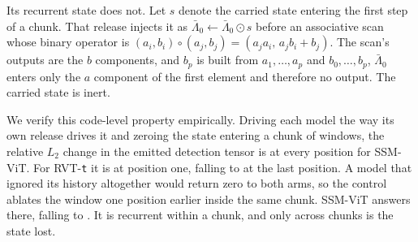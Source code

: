\documentclass[10pt,twocolumn,letterpaper]{article}
\begin{document}
Its recurrent state does not. Let $s$ denote the carried state entering the first
step of a chunk. That release injects it as
$\bar{\Lambda}_{0}\leftarrow\bar{\Lambda}_{0}\odot s$ before an associative scan whose
binary operator is $(a_{i},b_{i})\circ(a_{j},b_{j})=(a_{j}a_{i},\,a_{j}b_{i}+b_{j})$. The
scan's outputs are the $b$ components, and $b_{p}$ is built from $a_{1},\dots,a_{p}$ and
$b_{0},\dots,b_{p}$, $\bar{\Lambda}_{0}$ enters only the $a$ component of the first element
and therefore no output. The carried state is inert.

We verify this code-level property empirically. Driving each model the way its own release
drives it and zeroing the state entering a chunk of \ssmChunkMeas{} windows, the relative
$L_{2}$ change in the emitted detection tensor is \ssmStateEffect{} at every position for
SSM-ViT. For RVT-\texttt{t} it is \rvtStateEffectOne{} at position one, falling to
\rvtStateEffect{} at the last position. A model that ignored its history altogether would return zero to
both arms, so the control ablates the window one position earlier inside the same chunk.
SSM-ViT answers \ssmInchunkOne{} there, falling to \ssmInchunkLast{}. It is recurrent
within a chunk, and only across chunks is the state lost.
\end{document}
